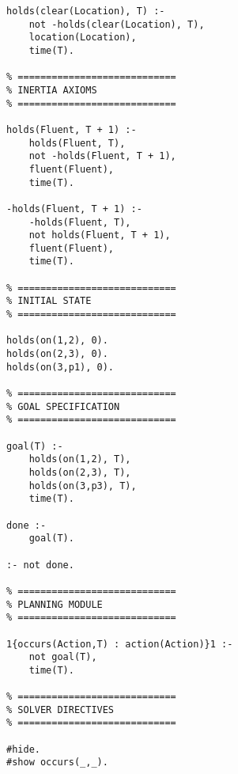 {\begin{lstlisting}
holds(clear(Location), T) :-
    not -holds(clear(Location), T),
    location(Location),
    time(T).

% ============================
% INERTIA AXIOMS
% ============================

holds(Fluent, T + 1) :-
    holds(Fluent, T),
    not -holds(Fluent, T + 1),
    fluent(Fluent),
    time(T).

-holds(Fluent, T + 1) :-
    -holds(Fluent, T),
    not holds(Fluent, T + 1),
    fluent(Fluent),
    time(T).

% ============================
% INITIAL STATE
% ============================

holds(on(1,2), 0).
holds(on(2,3), 0).
holds(on(3,p1), 0).

% ============================
% GOAL SPECIFICATION
% ============================

goal(T) :-
    holds(on(1,2), T),
    holds(on(2,3), T),
    holds(on(3,p3), T),
    time(T).

done :-
    goal(T).

:- not done.

% ============================
% PLANNING MODULE
% ============================

1{occurs(Action,T) : action(Action)}1 :-
    not goal(T),
    time(T).

% ============================
% SOLVER DIRECTIVES
% ============================

#hide.
#show occurs(_,_).
\end{lstlisting}
}